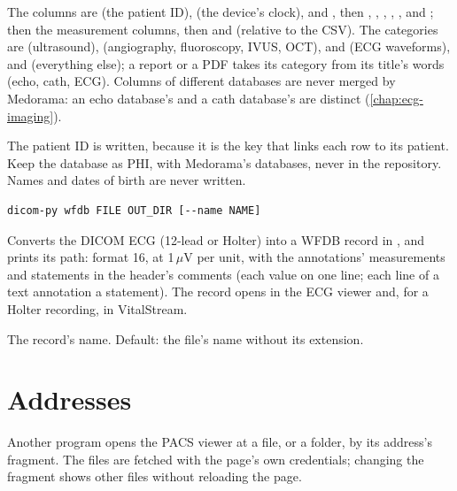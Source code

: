 The columns are  (the patient ID\phimark),  (the device's clock),
 and , then , , ,
, ,  and ; then the measurement columns,
then  and  (relative to the CSV). The categories are 
(ultrasound),  (angiography, fluoroscopy, IVUS, OCT),  and  (ECG
waveforms), and  (everything else); a report or a PDF takes its category from its
title's words (echo, cath, ECG). Columns of different databases are never merged by Medorama: an
echo database's  and a cath database's are distinct (\cref{chap:ecg-imaging}).

\begin{phibox}
The patient ID is written, because it is the key that links each row to its patient. Keep the
database as PHI, with Medorama's databases, never in the repository. Names and dates of birth are
never written.
\end{phibox}

\begin{lstlisting}[style=signature]
dicom-py wfdb FILE OUT_DIR [--name NAME]
\end{lstlisting}
Converts the DICOM ECG  (12-lead or Holter) into a WFDB record in , and
prints its path: format 16, at 1\,$\mu$V per unit, with the annotations' measurements and
statements in the header's comments (each value on one line; each line of a text annotation a
statement). The record opens in the ECG viewer and, for a Holter
recording, in VitalStream.
\begin{params}
\item[--name NAME] The record's name. Default: the file's name without its extension.
\end{params}

\section{Addresses}
\label{sec:pacs-viewer-address}

Another program opens the PACS viewer at a file, or a folder, by its address's fragment. The
files are fetched with the page's own credentials; changing the fragment shows other files
without reloading the page.

